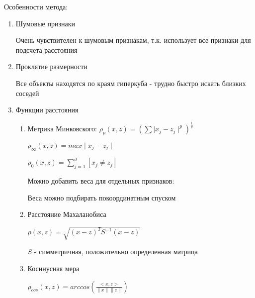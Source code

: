 \documentclass[a4paper, 12pt]{article}
\newcommand\norm[1]{\left\lVert#1\right\rVert}
\begin{document}
Особенности метода:

\begin{enumerate}
    \item Шумовые признаки
    
    Очень чувствителен к шумовым признакам, 
    т.к. использует все признаки для 
    подсчета расстояния

    \item Проклятие размерности
    
    Все объекты находятся по краям гиперкуба - трудно быстро искать 
    близких соседей

    \item Функции расстояния
    \begin{enumerate}
        \item Метрика Минковского: 
        $\rho_p(x, z) = (\sum \mid x_j - z_j \mid^p)^{\frac{1}{p}}$

        $\rho_{\infty}(x, z) = max \mid x_j - z_j \mid$

        $\rho_0(x, z) = \sum_{j = 1}^d [x_j \neq z_j]$
        
        Можно добавить веса для отдельных признаков:

        Веса можно подбирать покоординатным спуском
        \item Расстояние Махаланобиса
        
        $\rho(x, z) = \sqrt{(x - z)^T S^{-1} (x - z)}$

        $S$ - симметричная, положительно определенная матрица

        \item Косинусная мера
        

        $\rho_{cos}(x, z) = 
        arccos(\frac{<x, z>}{\norm{x}\norm{z}})$
    \end{enumerate}
\end{enumerate}
\end{document}
